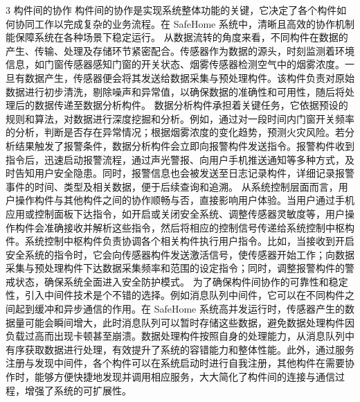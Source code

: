 3 构件间的协作 构件间的协作是实现系统整体功能的关键，它决定了各个构件如何协同工作以完成复杂的业务流程。在 SafeHome 系统中，清晰且高效的协作机制能保障系统在各种场景下稳定运行。
从数据流转的角度来看，不同构件在数据的产生、传输、处理及存储环节紧密配合。传感器作为数据的源头，时刻监测着环境信息，如门窗传感器感知门窗的开关状态、烟雾传感器检测空气中的烟雾浓度。一旦有数据产生，传感器便会将其发送给数据采集与预处理构件。该构件负责对原始数据进行初步清洗，剔除噪声和异常值，以确保数据的准确性和可用性，随后将处理后的数据传递至数据分析构件。
数据分析构件承担着关键任务，它依据预设的规则和算法，对数据进行深度挖掘和分析。例如，通过对一段时间内门窗开关频率的分析，判断是否存在异常情况；根据烟雾浓度的变化趋势，预测火灾风险。若分析结果触发了报警条件，数据分析构件会立即向报警构件发送指令。报警构件收到指令后，迅速启动报警流程，通过声光警报、向用户手机推送通知等多种方式，及时告知用户安全隐患。同时，报警信息也会被发送至日志记录构件，详细记录报警事件的时间、类型及相关数据，便于后续查询和追溯。
从系统控制层面而言，用户操作构件与其他构件之间的协作顺畅与否，直接影响用户体验。当用户通过手机应用或控制面板下达指令，如开启或关闭安全系统、调整传感器灵敏度等，用户操作构件会准确接收并解析这些指令，然后将相应的控制信号传递给系统控制中枢构件。系统控制中枢构件负责协调各个相关构件执行用户指令。比如，当接收到开启安全系统的指令时，它会向传感器构件发送激活信号，使传感器开始工作；向数据采集与预处理构件下达数据采集频率和范围的设定指令；同时，调整报警构件的警戒状态，确保系统全面进入安全防护模式。
为了确保构件间协作的可靠性和稳定性，引入中间件技术是个不错的选择。例如消息队列中间件，它可以在不同构件之间起到缓冲和异步通信的作用。在 SafeHome
系统高并发运行时，传感器产生的数据量可能会瞬间增大，此时消息队列可以暂时存储这些数据，避免数据处理构件因负载过高而出现卡顿甚至崩溃。数据处理构件按照自身的处理能力，从消息队列中有序获取数据进行处理，有效提升了系统的容错能力和整体性能。此外，通过服务注册与发现中间件，各个构件可以在系统启动时进行自我注册，其他构件在需要协作时，能够方便快捷地发现并调用相应服务，大大简化了构件间的连接与通信过程，增强了系统的可扩展性。
